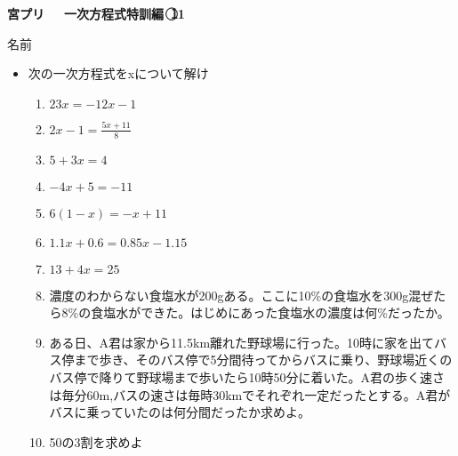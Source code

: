 \documentclass[a4paper,fleqn,papersize,15pt]{jsarticle}
\begin{document}
\clearpage
 \begin{center}
   \LARGE\textbf{宮プリ　~一次方程式特訓編~\textcircled{\scriptsize 11}}
     \begin{flushright}
       名前\underline{\hspace{8zw}}
     \end{flushright}
 \end{center}

 \begin{itemize}
   \item 次の一次方程式をxについて解け
   \begin{enumerate}
\item $23x=-12x-1$ \begin{flushright}\framebox[8em]{\rule{0pt}{6ex}}\end{flushright} %
\item $ 2x-1= \frac{5x+11}{8}$ \begin{flushright}\framebox[8em]{\rule{0pt}{6ex}}\end{flushright} %
\item $5+3x=4$ \begin{flushright}\framebox[8em]{\rule{0pt}{6ex}}\end{flushright} %
\item $-4x+5=-11$ \begin{flushright}\framebox[8em]{\rule{0pt}{6ex}}\end{flushright} %
\item $6(1-x)=-x+11$ \begin{flushright}\framebox[8em]{\rule{0pt}{6ex}}\end{flushright} %
\item $1.1x+0.6=0.85x-1.15$ \begin{flushright}\framebox[8em]{\rule{0pt}{6ex}}\end{flushright} %
\item $13+4x=25$ \begin{flushright}\framebox[8em]{\rule{0pt}{6ex}}\end{flushright} %
\item 濃度のわからない食塩水が200gある。ここに10\%の食塩水を300g混ぜたら8\%の食塩水ができた。はじめにあった食塩水の濃度は何\%だったか。 \vfill \begin{flushright}\framebox[8em]{\rule{0pt}{6ex}}\end{flushright} %
\item ある日、A君は家から11.5km離れた野球場に行った。10時に家を出てバス停まで歩き、そのバス停で5分間待ってからバスに乗り、野球場近くのバス停で降りて野球場まで歩いたら10時50分に着いた。A君の歩く速さは毎分60m,バスの速さは毎時30kmでそれぞれ一定だったとする。A君がバスに乗っていたのは何分間だったか求めよ。 \vfill \begin{flushright}\framebox[8em]{\rule{0pt}{6ex}}\end{flushright} %
\item 50の3割を求めよ \vfill \begin{flushright}\framebox[8em]{\rule{0pt}{6ex}}\end{flushright} %
\end{enumerate}
    \vfill
\end{itemize}
\clearpage
\end{document}
